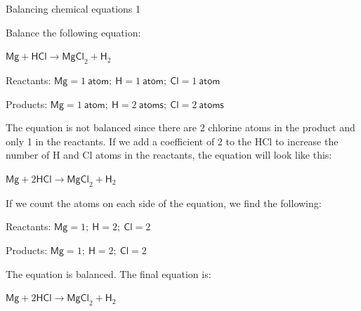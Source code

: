 \begin{wex}{Balancing chemical equations 1}{Balance the following equation:
\begin{center}
${\mathsf{Mg} + \mathsf{HCl} \rightarrow \mathsf{MgCl}_{2} + \mathsf{H}_{2}}$\\
\end{center}
}

{

Reactants: $\mathsf{Mg} = 1 ~\mathsf{atom;}~ \mathsf{H} = 1 ~\mathsf{atom;}~ \mathsf{Cl} = 1 ~\mathsf{atom}$

Products: $\mathsf{Mg} = 1 ~\mathsf{atom;}~ \mathsf{H} = 2 ~\mathsf{atoms;}~ \mathsf{Cl} = 2 ~\mathsf{atoms}$}

{
The equation is not balanced since there are 2 chlorine atoms in the product and only 1 in the reactants. If we add a coefficient of 2 to the HCl to increase the number of H and Cl atoms in the reactants, the equation will look like this:
\begin{center}
${\mathsf{Mg} + 2\mathsf{HCl} \rightarrow \mathsf{MgCl}_{2} + \mathsf{H}_{2}}$\\
\end{center}
}

{
If we count the atoms on each side of the equation, we find the following:

Reactants: $\mathsf{Mg} = 1;~ \mathsf{H} = 2;~ \mathsf{Cl} = 2$

Products: $\mathsf{Mg} = 1;~ \mathsf{H} = 2;~ \mathsf{Cl} = 2$

The equation is balanced. The final equation is:
\begin{center}
${\mathsf{Mg} + 2\mathsf{HCl} \rightarrow \mathsf{MgCl}_{2} + \mathsf{H}_{2}}$
\end{center}
}
\end{wex}
    \noindent
\par
            \label{m38726*secfhsst!!!underscore!!!id394}\vspace{.5cm} 
      \noindent
